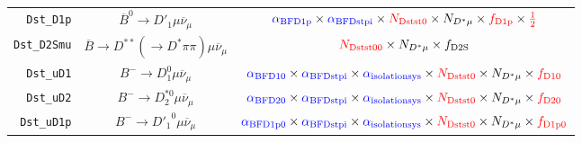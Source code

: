 \begin{landscape}
\begin{table}
\begin{tabular}{r|c|c}
     \texttt{Dst\_D1p} &             $\overline{B}^0 \rightarrow D'_1 \mu \overline{\nu}_\mu$              &                                                                                 $\textcolor{blue}{\alpha_\text{BFD1p}} \times \textcolor{blue}{\alpha_\text{BFDstpi}} \times \textcolor{red}{N_\text{Dstst0}} \times N_{D^* \mu} \times \textcolor{red}{f_\text{D1p}} \times \textcolor{red}{\frac{1}{2}}$                                                                                 \\
   \texttt{Dst\_D2Smu} & $\overline{B} \rightarrow D^{**} (\rightarrow D^* \pi\pi) \mu \overline{\nu}_\mu$ &                                                                                                                                                         $\textcolor{red}{N_\text{Dstst00}} \times N_{D^* \mu} \times f_\text{D2S}$                                                                                                                                                         \\
     \texttt{Dst\_uD1} &                  $B^- \rightarrow D_1^0 \mu \overline{\nu}_\mu$                   &                                                                         $\textcolor{blue}{\alpha_\text{BFD10}} \times \textcolor{blue}{\alpha_\text{BFDstpi}} \times \textcolor{blue}{\alpha_\text{isolationsys}} \times \textcolor{red}{N_\text{Dstst0}} \times N_{D^* \mu} \times \textcolor{red}{f_\text{D10}}$                                                                         \\
     \texttt{Dst\_uD2} &                 $B^- \rightarrow D_2^{*0} \mu \overline{\nu}_\mu$                 &                                                                         $\textcolor{blue}{\alpha_\text{BFD20}} \times \textcolor{blue}{\alpha_\text{BFDstpi}} \times \textcolor{blue}{\alpha_\text{isolationsys}} \times \textcolor{red}{N_\text{Dstst0}} \times N_{D^* \mu} \times \textcolor{red}{f_\text{D20}}$                                                                         \\
    \texttt{Dst\_uD1p} &                 $B^- \rightarrow {D'_1}^0 \mu \overline{\nu}_\mu$                 &                                                                        $\textcolor{blue}{\alpha_\text{BFD1p0}} \times \textcolor{blue}{\alpha_\text{BFDstpi}} \times \textcolor{blue}{\alpha_\text{isolationsys}} \times \textcolor{red}{N_\text{Dstst0}} \times N_{D^* \mu} \times \textcolor{red}{f_\text{D1p0}}$                                                                        \\

\end{tabular}
\end{table}
\end{landscape}
